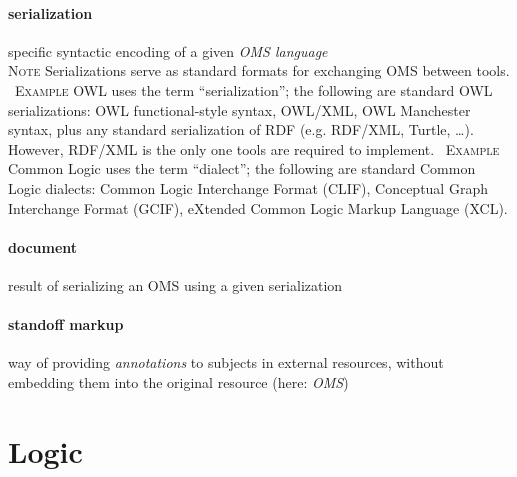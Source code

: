 \documentclass[10pt,%
\ifpretendfinal
final%
\else
draft%
\fi,
]{scrreprt}
\makeatletter
\newcommand*{\eg}{e.g.\@\xspace}
\newcommand*{\termref}[1]{\textit{#1}}
\newcommand{\sclause}[1]{\section{#1}}
\newcommand{\termdefinition}[2]{\paragraph{#1} #2}
\newenvironment{definitions}[0]{\medskip }{}
\newenvironment{note}[0]{\ \\ \textsc{Note} \quad}{}
\newenvironment{example}[0]{\ \newline \textsc{Example}\quad }{}
\makeatother
\begin{document}
\begin{definitions}
  \termdefinition{serialization}{specific syntactic encoding of a given \termref{OMS language}}
  \begin{note}
    Serializations serve as standard formats for exchanging OMS between tools.
  \end{note}
  \begin{example}
    OWL uses the term ``serialization''; the following are standard OWL serializations: OWL functional-style syntax, OWL/XML, OWL Manchester syntax, plus any standard serialization of RDF (\eg RDF/XML, Turtle, \dots).  However, RDF/XML is the only one tools are required to implement.
  \end{example}
  \begin{example}
Common Logic uses the term ``dialect''; the following are standard Common Logic dialects: Common Logic Interchange Format (CLIF), Conceptual Graph Interchange Format (GCIF), eXtended Common Logic Markup Language (XCL).
  \end{example}


   \termdefinition{document}{result of serializing an OMS using a given serialization}


  \termdefinition{standoff markup}{way of providing \termref{annotations} to subjects in external resources, without embedding them into the original resource (here: \termref{OMS})}
\end{definitions}

\sclause{Logic}
\end{document}
